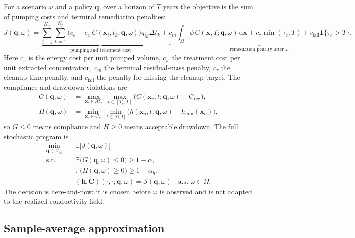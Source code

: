 \documentclass[11pt]{article}
\numberwithin{equation}{section}
\newcommand{\E}{\mathbb{E}}
\newcommand{\Prob}{\mathbb{P}}
\newcommand{\dd}{\,\mathrm{d}}
\newcommand{\xx}{\mathbf{x}}
\newcommand{\qq}{\mathbf{q}}
\newcommand{\ind}{\mathbf{1}}
\theoremstyle{plain}
\begin{document}
For a scenario $\omega$ and a policy $\qq$, over a horizon of $T$ years the
objective is the sum of pumping costs and terminal remediation penalties:
\begin{equation}
\label{eq:cost}
J(\qq,\omega)=
\underbrace{\sum_{i=1}^{N_w}\sum_{k=1}^{N_p}
\bigl(c_e+c_w\,C(\xx_i,t_k;\qq,\omega)\bigr)q_{ik}\Delta t_k}
_{\text{pumping and treatment cost}}
+
\underbrace{c_m\int_\Omega\phi\,C(\xx,T;\qq,\omega)\dd\xx
+c_\tau\min(\tau_c,T)
+c_{\mathrm{fail}}\ind\{\tau_c>T\}}
_{\text{remediation penalty after }T}.
\end{equation}
Here $c_e$ is the energy cost per unit pumped volume, $c_w$ the treatment cost
per unit extracted concentration, $c_m$ the terminal residual-mass penalty,
$c_\tau$ the cleanup-time penalty, and $c_{\mathrm{fail}}$ the penalty for
missing the cleanup target.  The compliance and drawdown violations are
\begin{align}
G(\qq,\omega)
&=\max_{\xx_c\in\mathcal{M}_c}\ \max_{t\in[T_c,T]}
\bigl(C(\xx_c,t;\qq,\omega)-C_{\mathrm{reg}}\bigr),
\label{eq:G}\\
H(\qq,\omega)
&=\min_{\xx_o\in\mathcal{O}_h}\ \min_{t\in(0,T]}
\bigl(h(\xx_o,t;\qq,\omega)-h_{\min}(\xx_o)\bigr),
\label{eq:H}
\end{align}
so $G\le0$ means compliance and $H\ge0$ means acceptable drawdown.  The full
stochastic program is
\begin{equation}
\label{eq:stochprogram}
\boxed{
\begin{aligned}
\min_{\qq\in\mathcal{Q}_{\mathrm{ad}}}\quad
& \E\bigl[J(\qq,\omega)\bigr]\\
\text{s.t.}\quad
& \Prob\bigl(G(\qq,\omega)\le0\bigr)\ge1-\alpha,\\
& \Prob\bigl(H(\qq,\omega)\ge0\bigr)\ge1-\alpha_h,\\
& (\mathbf{h},\mathbf{C})(\cdot,\cdot;\qq,\omega)
  =\mathcal{S}(\qq,\omega)
  \quad\text{a.s. }\omega\in\Omega.
\end{aligned}}
\end{equation}
The decision is here-and-now: it is chosen before $\omega$ is observed and is
not adapted to the realized conductivity field.

\subsection{Sample-average approximation}
\end{document}
